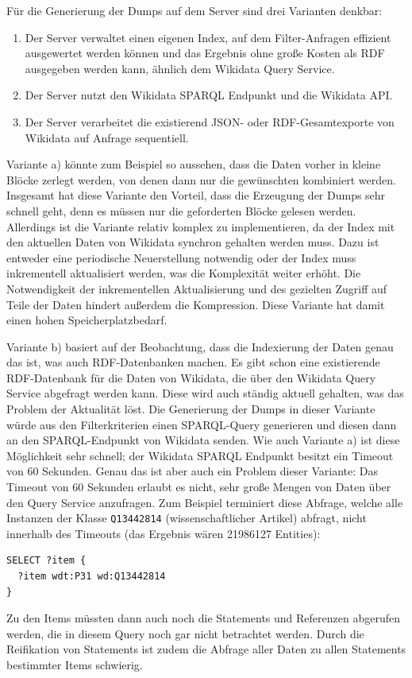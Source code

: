 Für die Generierung der Dumps auf dem Server sind drei Varianten denkbar:
\begin{enumerate}[label=\alph*) ]
  \item Der Server verwaltet einen eigenen Index, auf dem Filter-Anfragen effizient ausgewertet werden können und das Ergebnis ohne große Kosten als RDF ausgegeben werden kann, ähnlich dem Wikidata Query Service.
  \item Der Server nutzt den Wikidata SPARQL Endpunkt und die Wikidata API. 
  \item Der Server verarbeitet die existierend JSON- oder RDF-Gesamtexporte von Wikidata auf Anfrage sequentiell. 
\end{enumerate}
Variante a) könnte zum Beispiel so aussehen, dass die Daten vorher in kleine Blöcke zerlegt werden, von denen dann nur die gewünschten kombiniert werden.
Insgesamt hat diese Variante den Vorteil, dass die Erzeugung der Dumps sehr schnell geht, denn es müssen nur die geforderten Blöcke gelesen werden.
Allerdings ist die Variante relativ komplex zu implementieren, da der Index mit den aktuellen Daten von Wikidata synchron gehalten werden muss.
Dazu ist entweder eine periodische Neuerstellung notwendig oder der Index muss inkrementell aktualisiert werden, was die Komplexität weiter erhöht.
Die Notwendigkeit der inkrementellen Aktualisierung und des gezielten Zugriff auf Teile der Daten hindert außerdem die Kompression.
Diese Variante hat damit einen hohen Speicherplatzbedarf.

Variante b) basiert auf der Beobachtung, dass die Indexierung der Daten genau das ist, was auch RDF-Datenbanken machen.
Es gibt schon eine existierende RDF-Datenbank für die Daten von Wikidata, die über den Wikidata Query Service abgefragt werden kann.
Diese wird auch ständig aktuell gehalten, was das Problem der Aktualität löst.
Die Generierung der Dumps in dieser Variante würde aus den Filterkriterien einen SPARQL-Query generieren und diesen dann an den SPARQL-Endpunkt von Wikidata senden.
Wie auch Variante a) ist diese Möglichkeit sehr schnell; der Wikidata SPARQL Endpunkt besitzt ein Timeout von 60 Sekunden.
Genau das ist aber auch ein Problem dieser Variante: Das Timeout von 60 Sekunden erlaubt es nicht, sehr große Mengen von Daten über den Query Service anzufragen. Zum Beispiel terminiert diese Abfrage, welche alle Instanzen der Klasse \verb|Q13442814| (wissenschaftlicher Artikel) abfragt, nicht innerhalb des Timeouts (das Ergebnis wären 21986127 Entities):
\begin{lstlisting}[language=SPARQL, caption=SPARQL-Query nach wissenschaftlichen Artikeln]
SELECT ?item {
  ?item wdt:P31 wd:Q13442814
} 
\end{lstlisting}
Zu den Items müssten dann auch noch die Statements und Referenzen abgerufen werden, die in diesem Query noch gar nicht betrachtet werden.
Durch die Reifikation von Statements ist zudem die Abfrage aller Daten zu allen Statements bestimmter Items schwierig.

